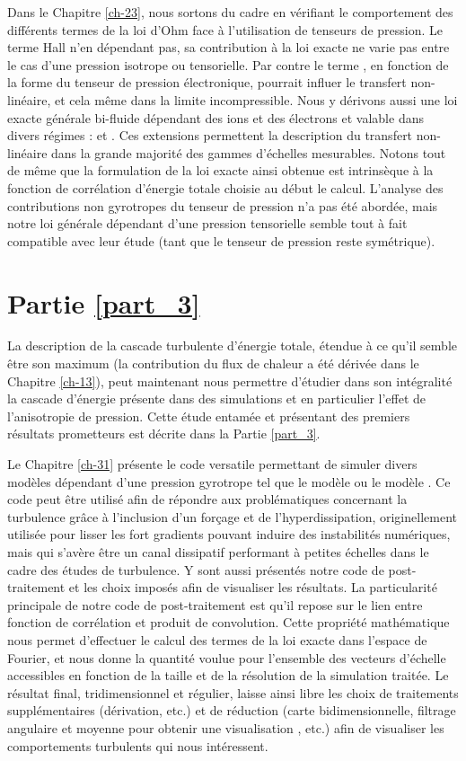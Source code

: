 Dans le Chapitre \ref{ch-23}, nous sortons du cadre  en vérifiant le comportement des différents termes de la loi d'Ohm face à l'utilisation de tenseurs de pression. Le terme Hall n'en dépendant pas, sa contribution à la loi exacte ne varie pas entre le cas d'une pression isotrope ou tensorielle. Par contre le terme , en fonction de la forme du tenseur de pression électronique, pourrait influer le transfert non-linéaire, et cela même dans la limite incompressible. Nous y dérivons aussi une loi exacte générale bi-fluide dépendant des ions et des électrons et valable dans divers régimes :  et . Ces extensions permettent la description du transfert non-linéaire dans la grande majorité des gammes d'échelles mesurables. Notons tout de même que la formulation de la loi exacte ainsi obtenue est intrinsèque à la fonction de corrélation d'énergie totale choisie au début le calcul. L'analyse des contributions non gyrotropes du tenseur de pression n'a pas été abordée, mais notre loi générale dépendant d'une pression tensorielle semble tout à fait compatible avec leur étude (tant que le tenseur de pression reste symétrique).   

\section{Partie \ref{part_3}}
La description de la cascade turbulente d'énergie totale, étendue à ce qu'il semble être son maximum (la contribution du flux de chaleur a été dérivée dans le Chapitre \ref{ch-13}), peut maintenant nous permettre d'étudier dans son intégralité la cascade d'énergie présente dans des simulations  et en particulier l'effet de l'anisotropie de pression. Cette étude entamée et présentant des premiers résultats prometteurs est décrite dans la Partie \ref{part_3}. 

Le Chapitre \ref{ch-31} présente le code versatile permettant de simuler divers modèles dépendant d'une pression gyrotrope tel que le modèle  ou le modèle . Ce code peut être utilisé afin de répondre aux problématiques concernant la turbulence grâce à l'inclusion d'un forçage et de l'hyperdissipation, originellement utilisée pour lisser les fort gradients pouvant induire des instabilités numériques, mais qui s'avère être un canal dissipatif performant à petites échelles dans le cadre des études de turbulence. Y sont aussi présentés notre code de post-traitement et les choix imposés afin de visualiser les résultats. La particularité principale de notre code de post-traitement est qu'il repose sur le lien entre fonction de corrélation et produit de convolution. Cette propriété mathématique nous permet d'effectuer le calcul des termes de la loi exacte dans l'espace de Fourier, et nous donne la quantité voulue pour l'ensemble des vecteurs d'échelle accessibles en fonction de la taille et de la résolution de la simulation traitée. Le résultat final, tridimensionnel et régulier, laisse ainsi libre les choix de traitements supplémentaires (dérivation, etc.) et de réduction (carte bidimensionnelle, filtrage angulaire et moyenne pour obtenir une visualisation , etc.) afin de visualiser les comportements turbulents qui nous intéressent. 

